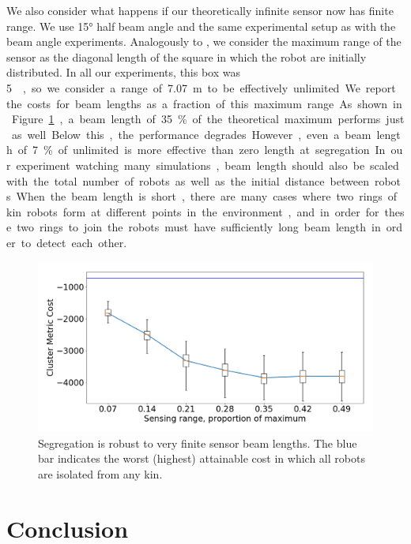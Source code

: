 \documentclass[conference]{IEEEtran}
\begin{document}
    We also consider what happens if our theoretically infinite sensor now has finite range. We use \ang{15} half beam angle and the same experimental setup as with the beam angle experiments. Analogously to \cite{gauci_self-organized_2014}, we consider the maximum range of the sensor as the diagonal length of the square in which the robot are initially distributed. In all our experiments, this box was \SI{5}{\meter\square}, so we consider a range of \SI{7.07}{\meter} to be effectively unlimited. We report the costs for beam lengths as a fraction of this maximum range. As shown in Figure \ref{fig:beam_length}, a beam length of 35\% of the theoretical maximum performs just as well. Below this, the performance degrades. However, even a beam length of 7\% of unlimited is more effective than zero length at segregation. In our experiment watching many simulations, beam length should also be scaled with the total number of robots as well as the initial distance between robots. When the beam length is short, there are many cases where two rings of kin robots form at different points in the environment, and in order for these two rings to join the robots must have sufficiently long beam length in order to detect each other.

    \begin{figure}
      \centering
      \includegraphics[width=1\linewidth]{./images/beam_length.png}
      \caption{Segregation is robust to very finite sensor beam lengths. The blue bar indicates the worst (highest) attainable cost in which all robots are isolated from any kin.}
      \label{fig:beam_length}
    \end{figure}

\section{Conclusion}
\end{document}
